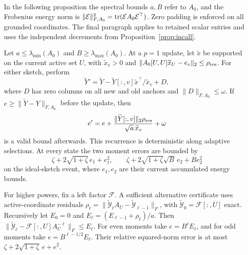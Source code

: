 In the following proposition the spectral bounds $a,B$ refer to
$A_0$, and the Frobenius energy norm is
$\|\mathcal E\|_{F,A_0}^2=\operatorname{tr}(\mathcal E A_0\mathcal E^\top)$. Zero padding is enforced on
all grounded coordinates. The final paragraph applies to retained
scalar entries and uses the independent decrements from
Proposition~\ref{prop:incall}.
\begin{proposition}
\label{prop:sketchresidual}
Let $a\leq\lambda_{\min}(A_0)$ and
$B\geq\lambda_{\max}(A_0)$. At a $p=1$ update, let
$\widetilde x$ be supported on the current active set $U$, with
$\widetilde x_v>0$ and
$\|A_0[U,U]\widetilde x_U-e_v\|_2\leq\rho_{\rm res}$.
For either sketch, perform
\[
 \widetilde Y'=
 \widetilde Y-\widetilde Y[:,v]\widetilde x^\top/
                 \widetilde x_v+D,
\]
where $D$ has zero columns on all new and old anchors and
$\|D\|_{F,A_0}\leq\omega$.
If $e\geq\|\widetilde Y-Y\|_{F,A_0}$ before the update, then
\begin{equation}\label{eq:sketchresidual}
 e'=e+\frac{\|\widetilde Y[:,v]\|_2\rho_{\rm res}}
                   {\sqrt a\,\widetilde x_v}+\omega
\end{equation}
is a valid bound afterwards. This recurrence is deterministic
along adaptive selections. At every state the two moment errors
are bounded by
\[
 \zeta+2\sqrt{1+\zeta}\,e_1+e_1^2,\qquad
 \zeta+2\sqrt{1+\zeta}\sqrt B\,e_2+B e_2^2
\]
on the ideal-sketch event, where $e_1,e_2$ are their current
accumulated energy bounds.

For higher powers, fix a left factor $\mathcal F$. A sufficient
alternative certificate uses active-coordinate residuals
$\rho_\ell=\|\widetilde{\mathcal Y}_\ell A_U-\widetilde{\mathcal Y}_{\ell-1}\|_F$,
with $\widetilde{\mathcal Y}_0=\mathcal F[:,U]$ exact. Recursively let
$E_0=0$ and $E_\ell=(E_{\ell-1}+\rho_\ell)/a$.
Then $\|\widetilde{\mathcal Y}_\ell-\mathcal F[:,U]A_U^{-\ell}\|_F\leq E_\ell$.
For even moments take $e=B^\ell E_\ell$, and for odd moments
take $e=B^{\ell-1/2}E_\ell$. Their relative squared-norm error
is at most $\zeta+2\sqrt{1+\zeta}\,e+e^2$.
\end{proposition}
